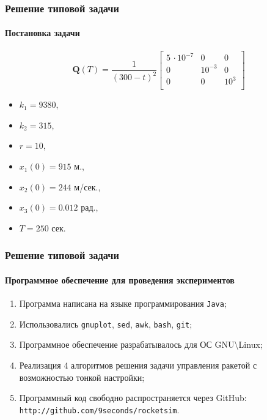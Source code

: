 \documentclass[ignorenonframetext,hyperref={pdftex,unicode},compress]{beamer}
\begin{document}
\begin{frame}
	\frametitle{Решение типовой задачи}
	\framesubtitle{Постановка задачи}
    
    \begin{equation*}
        \mathbf{Q}(T) = \frac{1}{(300-t)^2}\begin{bmatrix}
            5 \,\cdotp 10^{-7}  & 0       & 0    \\
            0                   & 10^{-3} & 0    \\
            0                   & 0       & 10^3 \\
        \end{bmatrix}
    \end{equation*}

    \begin{itemize}
        \item $k_1 = 9380$,
        \item $k_2 = 315$,
        \item $r = 10$,
        \item $x_1(0) = 915$ м.,
        \item $x_2(0) = 244$ м/сек.,
        \item $x_3(0) = 0.012$ рад.,
        \item $T = 250$ сек.
    \end{itemize}
\end{frame}



\begin{frame}
	\frametitle{Решение типовой задачи}
	\framesubtitle{Программное обеспечение для проведения экспериментов}
    
    \begin{enumerate}
        \item
            Программа написана на языке программирования \texttt{Java};

        \item
            Использовались \texttt{gnuplot}, \texttt{sed}, \texttt{awk}, \texttt{bash}, \texttt{git};

        \item
            Программное обеспечение разрабатывалось для ОС GNU\textbackslash Linux;

        \item
            Реализация 4 алгоритмов решения задачи управления ракетой с возможностью тонкой настройки;

        \item
            Программный код свободно распространяется через GitHub: \texttt{http://github.com/9seconds/rocketsim}.
    \end{enumerate}
\end{frame}
\end{document}
